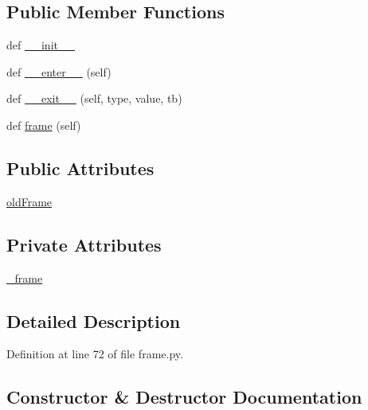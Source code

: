 \subsection*{Public Member Functions}
\begin{DoxyCompactItemize}
\item 
def \hyperlink{classmemoryoracle_1_1frame_1_1FrameSelector_a742ba8285608aac0eb255715b53457be}{\+\_\+\+\_\+init\+\_\+\+\_\+}
\item 
def \hyperlink{classmemoryoracle_1_1frame_1_1FrameSelector_a4e0a443a60750f1c5b152fc9728ceacf}{\+\_\+\+\_\+enter\+\_\+\+\_\+} (self)
\item 
def \hyperlink{classmemoryoracle_1_1frame_1_1FrameSelector_a47943496ca6dd736c106313c8804a60b}{\+\_\+\+\_\+exit\+\_\+\+\_\+} (self, type, value, tb)
\item 
def \hyperlink{classmemoryoracle_1_1frame_1_1FrameSelector_a20efcc94b4e8fcff6836bf82f3557af9}{frame} (self)
\end{DoxyCompactItemize}
\subsection*{Public Attributes}
\begin{DoxyCompactItemize}
\item 
\hyperlink{classmemoryoracle_1_1frame_1_1FrameSelector_a7d97514caf35237278ece2f916225c78}{old\+Frame}
\end{DoxyCompactItemize}
\subsection*{Private Attributes}
\begin{DoxyCompactItemize}
\item 
\hyperlink{classmemoryoracle_1_1frame_1_1FrameSelector_aba1efcf398054b163a312adc69b9058d}{\+\_\+frame}
\end{DoxyCompactItemize}


\subsection{Detailed Description}


Definition at line 72 of file frame.\+py.



\subsection{Constructor \& Destructor Documentation}
\hypertarget{classmemoryoracle_1_1frame_1_1FrameSelector_a742ba8285608aac0eb255715b53457be}{}
